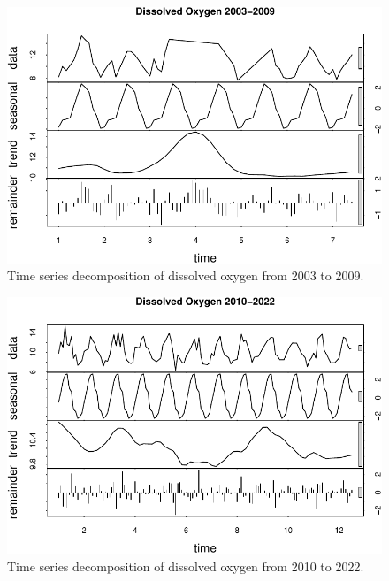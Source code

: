 \documentclass[
  12pt,
]{article}
\begin{document}
\begin{figure}

{\centering \includegraphics{Project_Template_files/figure-latex/Plot of Early Dissolved Oxygen Time Series Decomposition-1} 

}

\caption{Time series decomposition of dissolved oxygen from 2003 to 2009.}\label{fig:Plot of Early Dissolved Oxygen Time Series Decomposition}
\end{figure}

\begin{figure}

{\centering \includegraphics{Project_Template_files/figure-latex/Plot of Late Dissolved Oxygen Time Series Decomposition-1} 

}

\caption{Time series decomposition of dissolved oxygen from 2010 to 2022.}\label{fig:Plot of Late Dissolved Oxygen Time Series Decomposition}
\end{figure}
\end{document}
